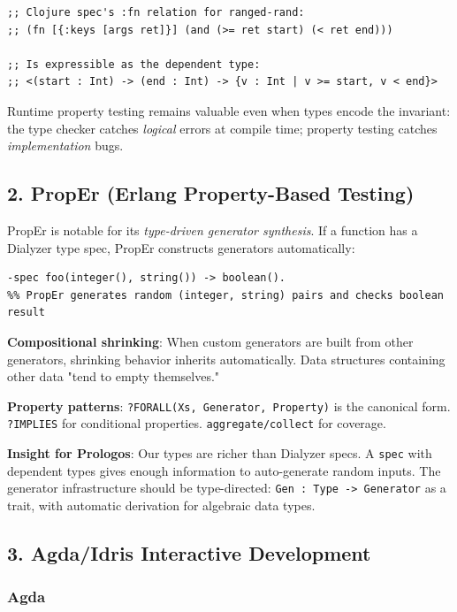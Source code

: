\documentclass[11pt]{article}
\begin{document}
\begin{verbatim}
;; Clojure spec's :fn relation for ranged-rand:
;; (fn [{:keys [args ret]}] (and (>= ret start) (< ret end)))

;; Is expressible as the dependent type:
;; <(start : Int) -> (end : Int) -> {v : Int | v >= start, v < end}>
\end{verbatim}

Runtime property testing remains valuable even when types encode the invariant:
the type checker catches \emph{logical} errors at compile time; property testing
catches \emph{implementation} bugs.
\subsection{2. PropEr (Erlang Property-Based Testing)}
\label{sec:org5592240}

PropEr is notable for its \emph{type-driven generator synthesis}. If a function has a
Dialyzer type spec, PropEr constructs generators automatically:

\begin{verbatim}
-spec foo(integer(), string()) -> boolean().
%% PropEr generates random (integer, string) pairs and checks boolean result
\end{verbatim}

\textbf{Compositional shrinking}: When custom generators are built from other
generators, shrinking behavior inherits automatically. Data structures
containing other data "tend to empty themselves."

\textbf{Property patterns}: \texttt{?FORALL(Xs, Generator, Property)} is the canonical form.
\texttt{?IMPLIES} for conditional properties. \texttt{aggregate/collect} for coverage.

\textbf{Insight for Prologos}: Our types are richer than Dialyzer specs. A \texttt{spec} with
dependent types gives enough information to auto-generate random inputs. The
generator infrastructure should be type-directed: \texttt{Gen : Type -> Generator} as a
trait, with automatic derivation for algebraic data types.
\subsection{3. Agda/Idris Interactive Development}
\label{sec:org558e5a3}

\subsubsection{Agda}
\label{sec:org6f69a3e}
\end{document}
